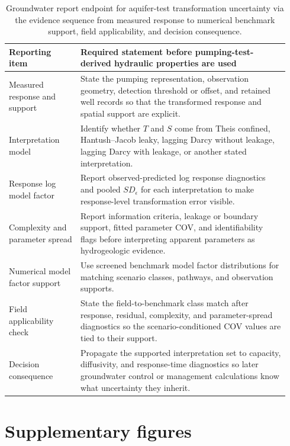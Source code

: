 \documentclass[12pt]{article}
\begin{document}
\begin{table}[!htbp]
\centering
\footnotesize
\setlength{\tabcolsep}{3.0pt}
\renewcommand{\arraystretch}{0.95}
\caption{Groundwater report endpoint for aquifer-test transformation uncertainty via the evidence sequence from measured response to numerical benchmark support, field applicability, and decision consequence.}
\label{tab:s_reportingframework}
\begin{tabular}{@{}>{\raggedright\arraybackslash}p{0.24\linewidth}>{\raggedright\arraybackslash}p{0.70\linewidth}@{}}
\toprule
Reporting item & Required statement before pumping-test-derived hydraulic properties are used \\
\midrule
Measured response and support & State the pumping representation, observation geometry, detection threshold or offset, and retained well records so that the transformed response and spatial support are explicit. \\
Interpretation model & Identify whether $T$ and $S$ come from Theis confined, Hantush--Jacob leaky, lagging Darcy without leakage, lagging Darcy with leakage, or another stated interpretation. \\
Response log model factor & Report observed-predicted log response diagnostics and pooled $SD_{\epsilon}$ for each interpretation to make response-level transformation error visible. \\
Complexity and parameter spread & Report information criteria, leakage or boundary support, fitted parameter COV, and identifiability flags before interpreting apparent parameters as hydrogeologic evidence. \\
Numerical model factor support & Use screened benchmark model factor distributions for matching scenario classes, pathways, and observation supports. \\
Field applicability check & State the field-to-benchmark class match after response, residual, complexity, and parameter-spread diagnostics so the scenario-conditioned COV values are tied to their support. \\
Decision consequence & Propagate the supported interpretation set to capacity, diffusivity, and response-time diagnostics so later groundwater control or management calculations know what uncertainty they inherit. \\
\bottomrule
\end{tabular}
\end{table}

\clearpage
\section*{Supplementary figures}
\end{document}
